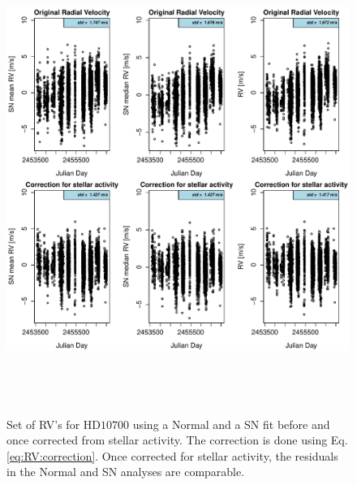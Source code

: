 \documentclass[11pt, oneside]{article}
\begin{document}
\begin{figure} 
   \centering
\includegraphics[height = 6in]{NEW_CORRECTIONHD10700_[3]CorrectionActivity_RadialVelocity_vs_time.pdf} 
   \caption{Set of RV's for $\text{HD}10700$  using a Normal and a SN fit before and once corrected from stellar activity. The correction is done using Eq. \ref{eq:RV:correction}. Once corrected for stellar activity, the residuals in the Normal and SN analyses are comparable.}
   \label{fig:HD10700:correctionRV}
\end{figure}
\end{document}
